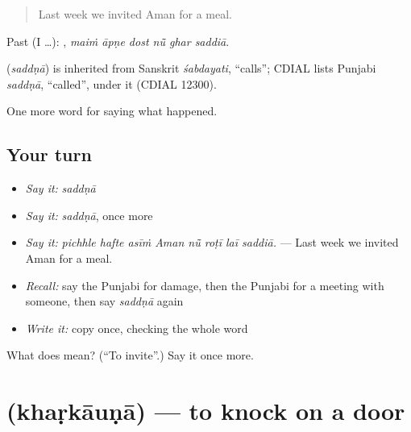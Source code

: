 \begin{quote}
Last week we invited Aman for a meal.
\end{quote}

Past (I …):      , \emph{maiṁ āpṇe dost nū̃ ghar saddiā}.

\begin{cousinweb}
\textbf{} (\emph{saddṇā}) is inherited from Sanskrit \emph{śabdayati}, \textquotedblleft{}calls\textquotedblright{}; CDIAL lists Punjabi \emph{saddṇā}, \textquotedblleft{}called\textquotedblright{}, under it (CDIAL 12300).
\end{cousinweb}

\begin{grammarlens}[title={What you've built}]
One more word for saying what happened.
\end{grammarlens}

\subsection*{Your turn}
\begin{itemize}
\raggedright
  \item \emph{Say it:} \emph{saddṇā}
  \item \emph{Say it:} \emph{saddṇā}, once more
  \item \emph{Say it:} \emph{pichhle hafte asīṁ Aman nū̃ roṭī laī saddiā.} — Last week we invited Aman for a meal.
  \item \emph{Recall:} say the Punjabi for damage, then the Punjabi for a meeting with someone, then say \emph{saddṇā} again
  \item \emph{Write it:} copy \textbf{} once, checking the whole word
\end{itemize}

\begin{tcolorbox}[breakable,colback=teal!4,colframe=teal!35!black,title={Before you move on}]
What does  mean? (\textquotedblleft{}To invite\textquotedblright{}.) Say it once more.
\end{tcolorbox}
\section[\texorpdfstring{\pa{ਖੜਕਾਉਣਾ} (khaṛkāuṇā)}{ਖੜਕਾਉਣਾ (khaṛkāuṇā)}]{ (khaṛkāuṇā) — to knock on a door}

\label{lesson:PA-C312-kharkauna}




